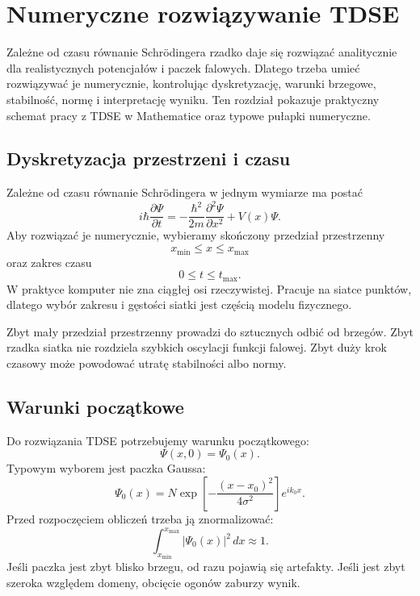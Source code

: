\chapter{Numeryczne rozwiązywanie TDSE}

\begin{summarybox}
Zależne od czasu równanie Schrödingera rzadko daje się rozwiązać analitycznie dla
realistycznych potencjałów i paczek falowych. Dlatego trzeba umieć rozwiązywać je
numerycznie, kontrolując dyskretyzację, warunki brzegowe, stabilność, normę i
interpretację wyniku. Ten rozdział pokazuje praktyczny schemat pracy z TDSE w
Mathematice oraz typowe pułapki numeryczne.
\end{summarybox}

\section{Dyskretyzacja przestrzeni i czasu}

Zależne od czasu równanie Schrödingera w jednym wymiarze ma postać
\begin{equation}
    i\hbar\frac{\partial\Psi}{\partial t}
    =-\frac{\hbar^2}{2m}\frac{\partial^2\Psi}{\partial x^2}+V(x)\Psi.
\end{equation}
Aby rozwiązać je numerycznie, wybieramy skończony przedział przestrzenny
\begin{equation}
    x_{\min}\leq x\leq x_{\max}
\end{equation}
oraz zakres czasu
\begin{equation}
    0\leq t\leq t_{\max}.
\end{equation}
W praktyce komputer nie zna ciągłej osi rzeczywistej. Pracuje na siatce punktów, dlatego wybór zakresu i gęstości siatki jest częścią modelu fizycznego.

Zbyt mały przedział przestrzenny prowadzi do sztucznych odbić od brzegów. Zbyt rzadka siatka nie rozdziela szybkich oscylacji funkcji falowej. Zbyt duży krok czasowy może powodować utratę stabilności albo normy.

\section{Warunki początkowe}

Do rozwiązania TDSE potrzebujemy warunku początkowego:
\begin{equation}
    \Psi(x,0)=\Psi_0(x).
\end{equation}
Typowym wyborem jest paczka Gaussa:
\begin{equation}
    \Psi_0(x)=N\exp\left[-\frac{(x-x_0)^2}{4\sigma^2}\right]e^{ik_0x}.
\end{equation}
Przed rozpoczęciem obliczeń trzeba ją znormalizować:
\begin{equation}
    \int_{x_{\min}}^{x_{\max}}|\Psi_0(x)|^2\,dx\approx 1.
\end{equation}
Jeśli paczka jest zbyt blisko brzegu, od razu pojawią się artefakty. Jeśli jest zbyt szeroka względem domeny, obcięcie ogonów zaburzy wynik.


